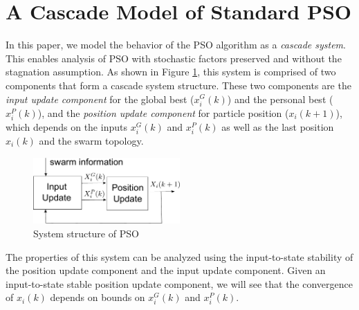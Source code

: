 \section{A Cascade Model of Standard PSO}
\label{sec:sys_model}

In this paper, we model the behavior of the PSO algorithm as a \emph{cascade system}.
This enables analysis of PSO with stochastic factors preserved and without the stagnation assumption.
As shown in Figure \ref{fig:sys_flow}, this system is comprised of two components that form a
cascade system structure.
These two components are the 
\emph{input update component} for the global best ($ x^{G}_{i}(k) $) and the personal best ($ x^{P}_{i}(k) $), and the 
\emph{position update component} for particle position ($ x_{i}(k+1) $), which depends on the inputs $ x^{G}_{i}(k) $ and $ x^{P}_{i}(k) $ as well as the last position $ x_{i}(k) $ and the swarm topology.

\begin{figure}
\centering
\includegraphics[width=0.5\textwidth]{sys_flow.pdf}
\caption{System structure of PSO}
\label{fig:sys_flow}
\end{figure}

The properties of this system can be analyzed using the input-to-state stability of the position update component and the input update component. 
Given an input-to-state stable position update component, we will see that the convergence of $ x_{i}(k) $ depends on bounds on $ x^{G}_{i}(k) $ and $ x^{P}_{i}(k) $.

%
%
%
%

